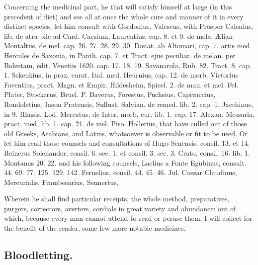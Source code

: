 Concerning the medicinal part, he that will satisfy himself at large
(in this precedent of diet) and see all at once the whole cure and
manner of it in every distinct species, let him consult with Gordonius,
Valescus, with Prosper Calenius, lib. de atra bile ad Card. Caesium,
Laurentius, cap. 8. et 9. de mela. \AE{}lian Montaltus, de mel. cap. 26.
27. 28. 29. 30. Donat. ab Altomari, cap. 7. artis med. Hercules de
Saxonia, in Panth. cap. 7. et Tract. ejus peculiar. de melan. per
Bolzetam, edit. Venetiis 1620. cap. 17. 18. 19. Savanarola, Rub. 82.
Tract. 8. cap. 1. Sckenkius, in prax. curat. Ital. med. Heurnius, cap.
12. de morb. Victorius Faventius, pract. Magn. et Empir. Hildesheim,
Spicel. 2. de man. et mel. Fel. Plater, Stockerus, Bruel. P. Baverus,
Forestus, Fuchsius, Capivaccius, Rondoletius, Jason Pratensis, Sullust.
Salvian. de remed. lib. 2. cap. 1. Jacchinus, in 9. Rhasis, Lod.
Mercatus, de Inter. morb. cur. lib. 1. cap. 17. Alexan. Messaria,
pract. med. lib. 1. cap. 21. de mel. Piso. Hollerius, \etc{} that have
culled out of those old Greeks, Arabians, and Latins, whatsoever is
observable or fit to be used. Or let him read those counsels and
consultations of Hugo Senensis, consil. 13. et 14. Reinerus Solenander,
consil. 6. sec. 1. et consil. 3. sec. 3. Crato, consil. 16. lib. 1.
Montanus 20. 22. and his following counsels, Laelius a Fonte Egubinus,
consult. 44. 69. 77. 125. 129. 142. Fernelius, consil. 44. 45. 46. Jul.
Caesar Claudinus, Mercurialis, Frambesarius, Sennertus, \etc{}

Wherein he shall find particular receipts, the whole method, preparatives,
purgers, correctors, averters, cordials in great variety and abundance:
out of which, because every man cannot attend to read or peruse them, I
will collect for the benefit of the reader, some few more notable
medicines.

\subsection{Bloodletting.}

